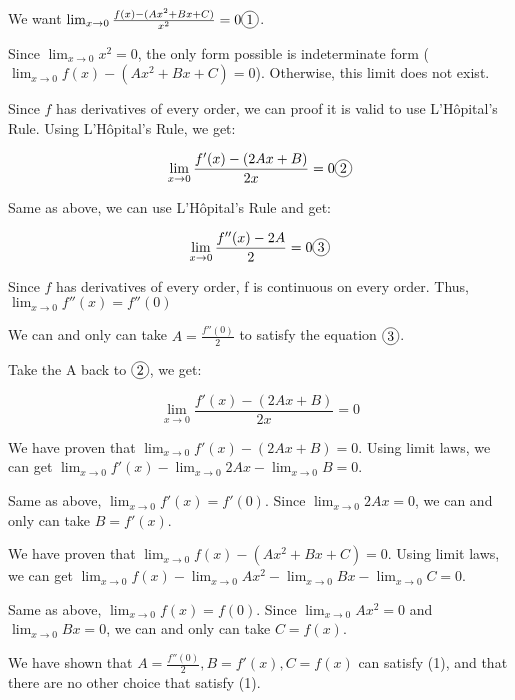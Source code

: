 \documentclass[12pt]{exam}
\newcommand*\circled[1]{\tikz[baseline=(char.base)]{
    \node[shape=circle, draw, inner sep=1pt, 
        minimum height=12pt] (char) {#1};}}
\begin{document}
\begin{enumerate}
\begin{enumerate}
			We want $\lim_{x \to 0} \frac{f(x) - (Ax^2 + Bx + C)}{x^2} = 0 \circled{1}$. 

			Since $\lim_{x \to 0} x^2 =0$, the only form possible is indeterminate form ($\lim_{x \to 0} f(x) - (Ax^2 + Bx + C) = 0$).
			Otherwise, this limit does not exist.

			Since $f$ has derivatives of every order, we can proof it is valid to use L'Hôpital's Rule. 
			Using L'Hôpital's Rule, we get:

			$$
				\lim_{x \to 0} \frac{f'(x) - (2Ax + B)}{2x} = 0 \circled{2}
			$$

			Same as above, we can use L'Hôpital's Rule and get:

			$$
				\lim_{x \to 0} \frac{f''(x) - 2A}{2} = 0 \circled{3}
			$$

			Since $f$ has derivatives of every order, f is continuous on every order. 
			Thus, $\lim_{x \to 0} f''(x) = f''(0)$

			We can and only can take $A = \frac{f''(0)}{2}$ to satisfy the equation $\circled{3}$.

			Take the A back to $\circled{2}$, we get:

			$$
				\lim_{x \to 0} \frac{f'(x) - (2Ax + B)}{2x} = 0
			$$

			We have proven that $\lim_{x \to 0} f'(x) - (2Ax + B) = 0$. 
			Using limit laws, we can get $\lim_{x \to 0} f'(x) - \lim_{x \to 0} 2Ax - \lim_{x \to 0}B = 0$.

			Same as above, $\lim_{x \to 0} f'(x) = f'(0)$. Since $\lim_{x \to 0} 2Ax = 0$, 
			we can and only can take $B = f'(x)$.

			We have proven that $\lim_{x \to 0} f(x) - (Ax^2 + Bx + C) = 0$.
			Using limit laws, we can get $\lim_{x \to 0} f(x) - \lim_{x \to 0}Ax^2 - \lim_{x \to 0}Bx - \lim_{x \to 0}C = 0$.
			
			Same as above, $\lim_{x \to 0} f(x) = f(0)$. Since $\lim_{x \to 0}Ax^2 = 0$ and $\lim_{x \to 0}Bx = 0$, 
			we can and only can take $C = f(x)$.

			We have shown that $A = \frac{f''(0)}{2}, B = f'(x), C = f(x)$ can satisfy (1), and that there are no other choice that satisfy (1).


\end{enumerate}
\end{enumerate}
\end{document}
